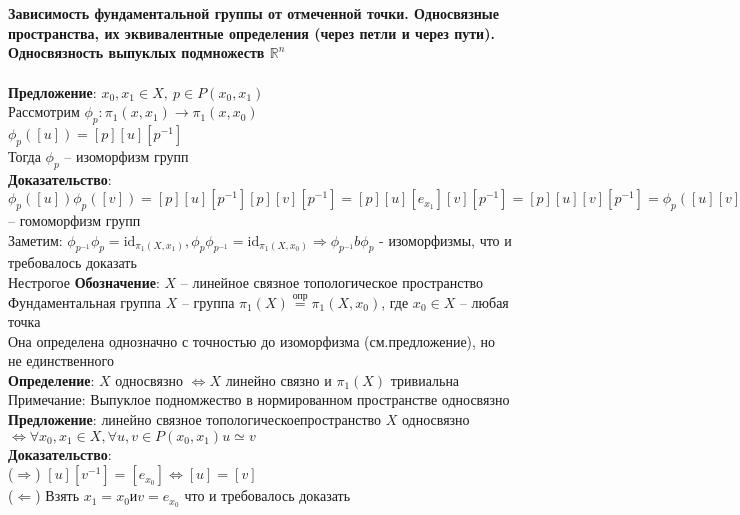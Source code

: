 \section{} 
	\textbf{Зависимость фундаментальной группы от отмеченной точки. Односвязные пространства, их эквивалентные определения (через петли и через пути). Односвязность выпуклых подмножеств $\mathbb{R}^n$}\\
	\\
	\textbf{Предложение}: $x_0, x_1 \in X,\ p\in P(x_0, x_1)$\\
	Рассмотрим ${\phi}_p: {\pi}_1(x, x_1) \rightarrow {\pi}_1(x,x_0)$\\
	${\phi}_p ([u]) = [p][u][p^{-1}]$\\
	Тогда ${\phi}_p$ -- изоморфизм групп\\
	\textbf{Доказательство}: ${\phi}_p ([u]) {\phi}_p ([v]) = [p][u][p^{-1}][p][v][p^{-1}] = [p][u][e_{x_1}][v][p^{-1}] = [p][u][v][p^{-1}] = {\phi}_p ([u][v]) \Rightarrow {\phi}_p$ -- гомоморфизм групп\\
	Заметим: ${\phi}_{p^{-1}} {\phi}_p =  \text{id}_{{\pi}_1 (X, x_1)}, {\phi}_p {\phi}_{p^{-1}} =  \text{id}_{{\pi}_1 (X, x_0)} \Rightarrow {\phi}_{p^{-1}} b {\phi}_p$ - изоморфизмы, что и требовалось доказать\\
	Нестрогое \textbf{Обозначение}: $X$ -- линейное связное топологическое пространство\\
	Фундаментальная группа $X$ -- группа ${\pi}_1 (X) \overset{опр}{ = } {\pi}_1 (X, x_0)$, где $x_0 \in X$ -- любая точка\\
	Она определена однозначно с точностью до изоморфизма (см.предложение), но не единственного\\
	\textbf{Определение}: $X$ односвязно $\Leftrightarrow X$ линейно связно и ${\pi}_1 (X)$ тривиальна\\
	Примечание: Выпуклое подномжество в нормированном пространстве односвязно\\
	\textbf{Предложение}: линейно связное топологическоепространство $X$ односвязно $\Leftrightarrow \forall x_0, x_1 \in X, \forall u, v \in P(x_0,x_1) u\simeq v$\\
	\textbf{Доказательство}:\\
	($\Rightarrow$) $[u][v^{-1}] = [e_{x_0}] \Leftrightarrow [u] = [v]$\\
	($\Leftarrow$) Взять $x_1 = x_0 и v = e_{x_0}$ что и требовалось доказать
	


\newpage

